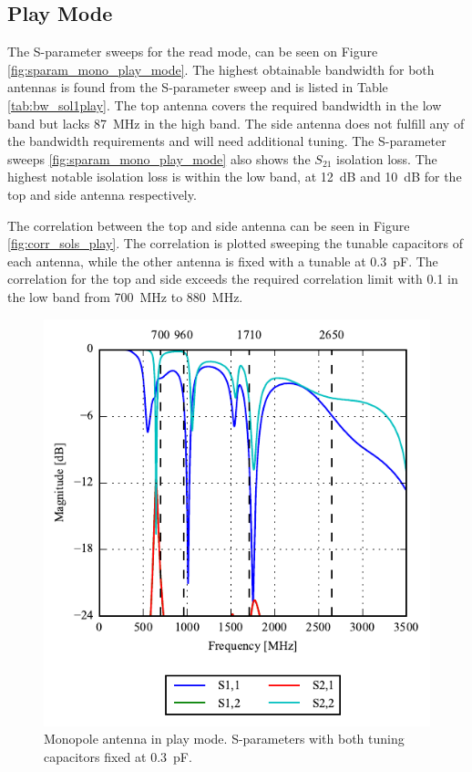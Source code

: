 \FloatBarrier
\subsection{Play Mode}
The S-parameter sweeps for the read mode, can be seen on Figure \ref{fig:sparam_mono_play_mode}. The highest obtainable bandwidth for both antennas is found from the S-parameter sweep and is listed in Table \ref{tab:bw_sol1play}. The top antenna covers the required bandwidth in the low band but lacks \SI{87}{MHz} in the high band. The side antenna does not fulfill any of the bandwidth requirements and will need additional tuning. The S-parameter sweeps \ref{fig:sparam_mono_play_mode} also shows the $S_{21}$ isolation loss. The highest notable isolation loss is within the low band, at \SI{12}{dB} and \SI{10}{dB} for the top and side antenna respectively.       

The correlation between the top and side antenna can be seen in Figure \ref{fig:corr_sols_play}. The correlation is plotted sweeping the tunable capacitors of each antenna, while the other antenna is fixed with a tunable at \SI{0.3}{pF}. The correlation for the top and side exceeds the required correlation limit with 0.1 in the low band from \SI{700}{MHz} to \SI{880}{MHz}.

\begin{figure}[htbp]
    \centering
    \includegraphics{img/tech_sol/monopole/play_mode/sparams_play.pdf}
    \caption{Monopole antenna in play mode. S-parameters with both tuning capacitors fixed at \SI{0.3}{pF}.}
    \label{fig:triang_sparam_read}
\end{figure}


